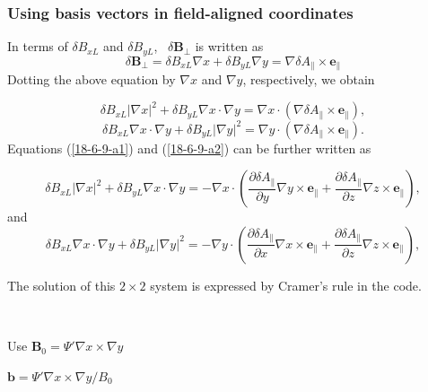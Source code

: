 \documentclass{article}
\begin{document}
\subsubsection{Using basis vectors in field-aligned coordinates}

In terms of $\delta B_{x L}$ and $\delta B_{y L}$, \ $\delta
\mathbf{B}_{\perp}$ is written as
\begin{equation}
  \delta \mathbf{B}_{\perp} = \delta B_{x L} \nabla x + \delta B_{y L} \nabla
  y = \nabla \delta A_{\parallel} \times \mathbf{e}_{\parallel}
\end{equation}
Dotting the above equation by $\nabla x$ and $\nabla y$, respectively, we
obtain


\begin{equation}
  \label{18-6-9-a1} \delta B_{x L} | \nabla x |^2 + \delta B_{y L} \nabla x
  \cdot \nabla y = \nabla x \cdot (\nabla \delta A_{\parallel} \times
  \mathbf{e}_{\parallel}),
\end{equation}
\begin{equation}
  \label{18-6-9-a2} \delta B_{x L} \nabla x \cdot \nabla y + \delta B_{y L} |
  \nabla y |^2 = \nabla y \cdot (\nabla \delta A_{\parallel} \times
  \mathbf{e}_{\parallel}) .
\end{equation}
Equations (\ref{18-6-9-a1}) and (\ref{18-6-9-a2}) can be further written as


\begin{equation}
  \delta B_{x L} | \nabla x |^2 + \delta B_{y L} \nabla x \cdot \nabla y = -
  \nabla x \cdot \left( \frac{\partial \delta A_{\parallel}}{\partial y}
  \nabla y \times \mathbf{e}_{\parallel} + \frac{\partial \delta
  A_{\parallel}}{\partial z} \nabla z \times \mathbf{e}_{\parallel} \right),
\end{equation}
and
\begin{equation}
  \delta B_{x L} \nabla x \cdot \nabla y + \delta B_{y L} | \nabla y |^2 = -
  \nabla y \cdot \left( \frac{\partial \delta A_{\parallel}}{\partial x}
  \nabla x \times \mathbf{e}_{\parallel} + \frac{\partial \delta
  A_{\parallel}}{\partial z} \nabla z \times \mathbf{e}_{\parallel} \right),
\end{equation}


The solution of this $2 \times 2$ system is expressed by Cramer's rule in the
code.

\

Use $\mathbf{B}_0 = \Psi' \nabla x \times \nabla y$

$\mathbf{b}= \Psi' \nabla x \times \nabla y / B_0$
\end{document}
